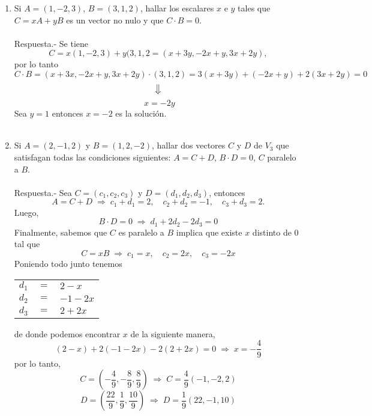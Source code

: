 \begin{enumerate}
\item Si $A = (1,-2,3)$, $B=(3,1,2)$, hallar los escalares $x$ e $y$ tales que $C = xA + yB$ es un vector no nulo y que $C\cdot B = 0$.\\\\
    Respuesta.-\; Se tiene $$C = x(1,-2,3) + y(3,1,2 = (x+3y,-2x+y,3x+2y),$$ por lo tanto $$C\cdot B = (x+3x,-2x+y,3x+2y)\cdot (3,1,2) = 3(x+3y)+(-2x+y)+2(3x+2y) = 0 $$ $$\big\Downarrow$$ $$\; x = -2y$$ 
    Sea $y=1$ entonces $x=-2$ es la solución.\\\\

\item Si $A=(2,-1,2)$ y $B=(1,2,-2)$, hallar dos vectores $C$ y $D$ de $V_3$ que satisfagan todas las condiciones siguientes: $A=C+D$, $B\cdot D = 0$, $C$ paralelo a $B$.\\\\
    Respuesta.-\;  Sea $C=(c_1,c_2,c_3)$ y $D=(d_1,d_2,d_3)$, entonces $$A=C+D \;  \Longrightarrow\; c_1+d_1=2, \quad c_2+d_2=-1, \quad c_3+d_3 = 2.$$
    Luego, $$B\cdot D = 0\; \Longrightarrow \; d_1+2d_2-2d_3=0$$
    Finalmente, sabemos que $C$ es paralelo a $B$ implica que existe $x$ distinto de $0$ tal que 
    $$C=xB \; \Longrightarrow \; c_1=x, \quad c_2=2x, \quad c_3 = -2x$$
    Poniendo todo junto tenemos 
    \begin{center}
	\begin{tabular}{rcl}
	    $d_1$&$=$&$2-x$\\
	    $d_2$&$=$&$-1-2x$\\
	    $d_3$&$=$&$2+2x$\\
	\end{tabular}
    \end{center}
     de donde podemos encontrar $x$ de la siguiente manera,
     $$(2-x)+2(-1-2x)-2(2+2x)=0 \; \Longrightarrow\; x=-\dfrac{4}{9}$$
     por lo tanto, $$C=\left(-\dfrac{4}{9},-\dfrac{8}{9},\dfrac{8}{9}\right) \; \Longrightarrow \;  C=\dfrac{4}{9}(-1,-2,2)$$ $$D=\left(\dfrac{22}{9},\dfrac{1}{9},\dfrac{10}{9} \right) \; \Longrightarrow \; D=\dfrac{1}{9}(22,-1,10)$$\\


\end{enumerate}
